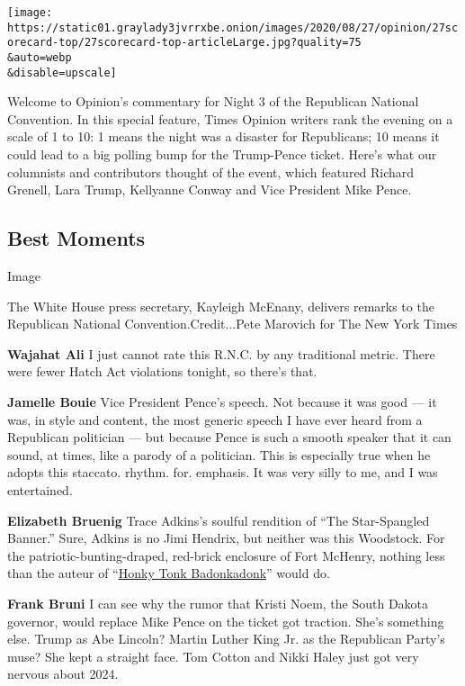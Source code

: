 \texttt{[image: https://static01.graylady3jvrrxbe.onion/images/2020/08/27/opinion/27scorecard-top/27scorecard-top-articleLarge.jpg?quality=75\\\&auto=webp\\\&disable=upscale]}

Welcome to Opinion's commentary for Night 3 of the Republican National
Convention. In this special feature, Times Opinion writers rank the
evening on a scale of 1 to 10: 1 means the night was a disaster for
Republicans; 10 means it could lead to a big polling bump for the
Trump-Pence ticket. Here's what our columnists and contributors thought
of the event, which featured Richard Grenell, Lara Trump, Kellyanne
Conway and Vice President Mike Pence.

\hypertarget{best-moments}{%
\subsection{Best Moments}\label{best-moments}}

Image

The White House press secretary, Kayleigh McEnany, delivers remarks to
the Republican National Convention.Credit...Pete Marovich for The New
York Times

\textbf{Wajahat Ali} I just cannot rate this R.N.C. by any traditional
metric. There were fewer Hatch Act violations tonight, so there's that.

\textbf{Jamelle Bouie} Vice President Pence's speech. Not because it was
good --- it was, in style and content, the most generic speech I have
ever heard from a Republican politician --- but because Pence is such a
smooth speaker that it can sound, at times, like a parody of a
politician. This is especially true when he adopts this staccato.
rhythm. for. emphasis. It was very silly to me, and I was entertained.

\textbf{Elizabeth Bruenig} Trace Adkins's soulful rendition of ``The
Star-Spangled Banner.'' Sure, Adkins is no Jimi Hendrix, but neither was
this Woodstock. For the patriotic-bunting-draped, red-brick enclosure of
Fort McHenry, nothing less than the auteur of
``\href{https://en.wikipedia.org/wiki/Honky_Tonk_Badonkadonk}{Honky Tonk
Badonkadonk}'' would do.

\textbf{Frank Bruni} I can see why the rumor that Kristi Noem, the South
Dakota governor, would replace Mike Pence on the ticket got traction.
She's something else. Trump as Abe Lincoln? Martin Luther King Jr. as
the Republican Party's muse? She kept a straight face. Tom Cotton and
Nikki Haley just got very nervous about 2024.

